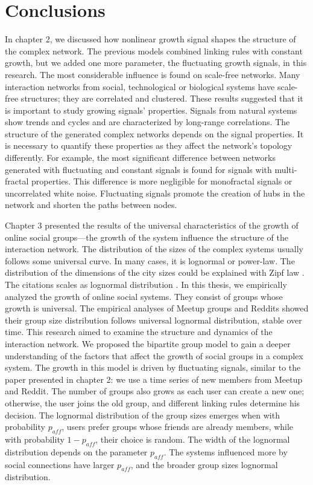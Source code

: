 \chapter{Conclusions} %
\label{Ch:Conclussion}


In chapter 2, we discussed how nonlinear growth signal shapes the structure of the complex network. The previous models combined linking rules with constant growth, but we added one more parameter, the fluctuating growth signals, in this research. The most considerable influence is found on scale-free networks. Many interaction networks from social, technological or biological systems have scale-free structures; they are correlated and clustered. These results suggested that it is important to study growing signals' properties. Signals from natural systems show trends and cycles and are characterized by long-range correlations. The structure of the generated complex networks depends on the signal properties. It is necessary to quantify these properties as they affect the network's topology differently. For example, the most significant difference between networks generated with fluctuating and constant signals is found for signals with multi-fractal properties. This difference is more negligible for monofractal signals or uncorrelated white noise. Fluctuating signals promote the creation of hubs in the network and shorten the paths between nodes.

Chapter 3 presented the results of the universal characteristics of the growth of online social groups—the growth of the system influence the structure of the interaction network. The distribution of the sizes of the complex systems usually follows some universal curve. In many cases, it is lognormal or power-law. The distribution of the dimensions of the city sizes could be explained with Zipf law \cite{gabaix1999}. The citations scales as lognormal distribution \cite{radicchi2008universality}. In this thesis, we empirically analyzed the growth of online social systems. They consist of groups whose growth is universal. The empirical analyses of Meetup groups and Reddits showed their group size distribution follows universal lognormal distribution, stable over time. This research aimed to examine the structure and dynamics of the interaction network. We proposed the bipartite group model to gain a deeper understanding of the factors that affect the growth of social groups in a complex system. The growth in this model is driven by fluctuating signals, similar to the paper presented in chapter 2: we use a time series of new members from Meetup and Reddit. The number of groups also grows as each user can create a new one; otherwise, the user joins the old group, and different linking rules determine his decision. The lognormal distribution of the group sizes emerges when with probability $p_{aff}$, users prefer groups whose friends are already members, while with probability $1-p_{aff}$, their choice is random. The width of the lognormal distribution depends on the parameter $p_{aff}$. The systems influenced more by social connections have larger $p_{aff}$, and the broader group sizes lognormal distribution.

